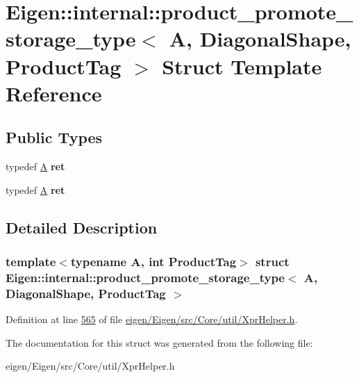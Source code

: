 \hypertarget{struct_eigen_1_1internal_1_1product__promote__storage__type_3_01_a_00_01_diagonal_shape_00_01_product_tag_01_4}{}\section{Eigen\+:\+:internal\+:\+:product\+\_\+promote\+\_\+storage\+\_\+type$<$ A, Diagonal\+Shape, Product\+Tag $>$ Struct Template Reference}
\label{struct_eigen_1_1internal_1_1product__promote__storage__type_3_01_a_00_01_diagonal_shape_00_01_product_tag_01_4}
\subsection*{Public Types}
\begin{DoxyCompactItemize}
\item 
\mbox{\label{struct_eigen_1_1internal_1_1product__promote__storage__type_3_01_a_00_01_diagonal_shape_00_01_product_tag_01_4_a290815d1c0a42b321007f57f6613c1e9}} 
typedef \hyperlink{group___core___module_class_eigen_1_1_matrix}{A} {\bfseries ret}
\item 
\mbox{\label{struct_eigen_1_1internal_1_1product__promote__storage__type_3_01_a_00_01_diagonal_shape_00_01_product_tag_01_4_a290815d1c0a42b321007f57f6613c1e9}} 
typedef \hyperlink{group___core___module_class_eigen_1_1_matrix}{A} {\bfseries ret}
\end{DoxyCompactItemize}


\subsection{Detailed Description}
\subsubsection*{template$<$typename A, int Product\+Tag$>$\newline
struct Eigen\+::internal\+::product\+\_\+promote\+\_\+storage\+\_\+type$<$ A, Diagonal\+Shape, Product\+Tag $>$}



Definition at line \hyperlink{eigen_2_eigen_2src_2_core_2util_2_xpr_helper_8h_source_l00565}{565} of file \hyperlink{eigen_2_eigen_2src_2_core_2util_2_xpr_helper_8h_source}{eigen/\+Eigen/src/\+Core/util/\+Xpr\+Helper.\+h}.



The documentation for this struct was generated from the following file\+:\begin{DoxyCompactItemize}
\item 
eigen/\+Eigen/src/\+Core/util/\+Xpr\+Helper.\+h\end{DoxyCompactItemize}
